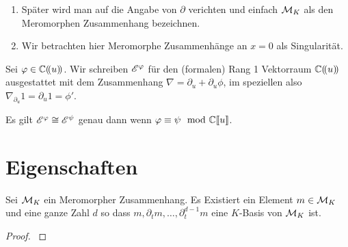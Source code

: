 \begin{bem}
\begin{enumerate}
\item Später wird man auf die Angabe von $\partial$ verichten und einfach
$\mathcal{M}_K$ als den Meromorphen Zusammenhang bezeichnen.
\item Wir betrachten hier Meromorphe Zusammenhänge an $x=0$ als
Singularität.
\end{enumerate}
\end{bem}

\begin{defn}
\cite[1.a]{sabbah_Fourier-local}
Sei $\varphi\in\mathbb{C}(\!(u)\!)$.
Wir schreiben $\mathscr{E}^\varphi$ für den (formalen) Rang 1 Vektorraum $\mathbb{C}(\!(u)\!)$
ausgestattet mit dem Zusammenhang $\nabla=\partial_u+\partial_u\phi$, im
speziellen also $\nabla_{\partial_u}1=\partial_u1=\phi'$.\\
\begin{comment}
Also
\begin{align*}
\sE^\phi=\Cful & \overset{\partial_u}{\rightarrow} \Cful\\
1              & \mapsto \phi'(u)\\
f(u)           & \mapsto f'(u)+f(u)\phi'(u)\\
\end{align*}
\end{comment}
\end{defn}

\begin{bem}
\cite[1.a]{sabbah_Fourier-local}
Es gilt $\mathscr{E}^\varphi\cong\mathscr{E}^\psi$ genau dann wenn $\varphi\equiv\psi \mod {{\mathbb C\llbracket u\rrbracket}}$.
\end{bem}

\section{Eigenschaften}
\begin{comment}
\cite[4.2]{sabbah_cimpa90}
Let $\cM$ be a left $\cD$-module. First we consider it only as a
$\C\{x\}$-module and let $\cM[x^{-1}]$ be the localized module.
\end{comment}

\begin{lem}
\cite[Thm 4.3.3]{sabbah_cimpa90}
\cite[Satz 4.8]{ZulaBarbara}
Sei $\mathcal{M}_K$ ein Meromorpher Zusammenhang. Es Existiert ein Element
$m\in\mathcal{M}_K$ und eine ganze Zahl $d$ so dass
$m,\partial_tm,\dots,\partial_t^{d-1}m$ eine $K$-Basis von $\mathcal{M}_K$ ist.
\end{lem}
\begin{proof}
\cite[Satz 4.8]{ZulaBarbara}
\end{proof}

